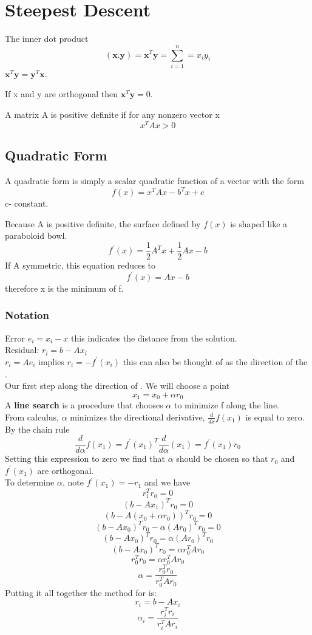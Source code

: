 \section{Steepest Descent}
\begin{definition}
The inner dot product 
\[(\mathbf{x}.  \mathbf{y})=\mathbf{x}^T  \mathbf{y}=\sum_{i=1}^n=x_iy_i \]
$\mathbf{x}^T  \mathbf{y} =\mathbf{y}^T  \mathbf{x}$.
\end{definition}
\begin{definition}
If x and y are orthogonal then $\mathbf{x}^T  \mathbf{y} =0$.
\end{definition}
\begin{definition}
A matrix A is positive definite if for any nonzero vector x
\[x^{T}Ax > 0 \]
\end{definition}
\subsection{Quadratic Form}
A quadratic form is simply a scalar quadratic function of a vector with the form
\[f(x)=x^TAx-b^Tx+c \]
c- constant.

Because A is positive definite, the surface defined by $f(x)$ is shaped like a paraboloid bowl.
\[f^{'}(x) = \frac{1}{2}A^Tx+\frac{1}{2}Ax - b \]
If A symmetric, this equation reduces to
\[
f^{'}(x)=Ax-b \]
therefore x is the minimum of f.

\subsubsection*{Notation}
Error $e_i=x_i-x$ this indicates the distance from the solution. \\
Residual: $r_i=b-Ax_i$\\
$r_i=Ae_i$ implies $r_i=-f^{'}(x_i)$ this can also be thought of as the direction
of the .\\
Our first step along the direction of . We will choose a point
\[ x_1=x_0+\alpha r_0\]
A \textbf{line search} is a procedure that chooses $\alpha$ to minimize f along
the line.\\
From calculus, $\alpha$ minimizes the directional derivative, $\frac{d}{dx}f(x_1)$ is equal to zero.\\
By the chain rule
\[\frac{d}{d\alpha}f(x_1)=f^{'}(x_1)^T\frac{d}{d\alpha}(x_1)=f^{'}(x_1)r_0 \]
Setting this expression to zero we find that $\alpha$ should be chosen so that 
$r_0$ and $f^{'}(x_1)$ are orthogonal.\\
To determine $\alpha$, note $f^{'}(x_1)=-r_1$ and we have
\[r_1^{T}r_0=0 \]
\[(b-Ax_1)^{T}r_0=0 \]
\[(b-A(x_0+\alpha r_0))^{T}r_0=0 \]
\[(b-Ax_0)^{T}r_0-\alpha (Ar_0)^{T}r_0=0 \]
\[(b-Ax_0)^{T}r_0=\alpha (Ar_0)^{T}r_0 \]
\[(b-Ax_0)^{T}r_0=\alpha r_0^{T}Ar_0 \]
\[r_0^{T}r_0=\alpha r_0^{T}Ar_0 \]
\[\alpha = \frac{r_0^Tr_0}{r_0^TAr_0}\]
Putting it all together the method for  is:
\[r_i=b-Ax_i \]
\[\alpha_i = \frac{r_i^Tr_i}{r_i^TAr_i}\]
